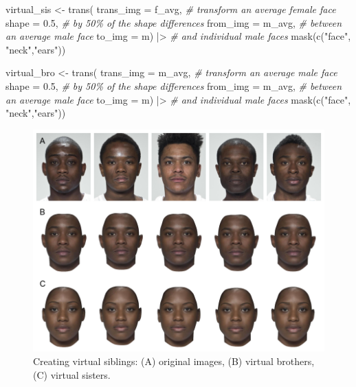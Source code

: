 \documentclass[
  doc,floatsintext]{apa6}
\newenvironment{Shaded}{\begin{snugshade}}{\end{snugshade}}
\newcommand{\AttributeTok}[1]{\textcolor[rgb]{0.77,0.63,0.00}{#1}}
\newcommand{\CommentTok}[1]{\textcolor[rgb]{0.56,0.35,0.01}{\textit{#1}}}
\newcommand{\FloatTok}[1]{\textcolor[rgb]{0.00,0.00,0.81}{#1}}
\newcommand{\FunctionTok}[1]{\textcolor[rgb]{0.00,0.00,0.00}{#1}}
\newcommand{\NormalTok}[1]{#1}
\newcommand{\OtherTok}[1]{\textcolor[rgb]{0.56,0.35,0.01}{#1}}
\newcommand{\SpecialCharTok}[1]{\textcolor[rgb]{0.00,0.00,0.00}{#1}}
\newcommand{\StringTok}[1]{\textcolor[rgb]{0.31,0.60,0.02}{#1}}
\begin{document}
\begin{Shaded}
\begin{Highlighting}[]
\NormalTok{virtual\_sis }\OtherTok{\textless{}{-}} \FunctionTok{trans}\NormalTok{(}
  \AttributeTok{trans\_img =}\NormalTok{ f\_avg,   }\CommentTok{\# transform an average female face}
  \AttributeTok{shape =} \FloatTok{0.5}\NormalTok{,         }\CommentTok{\# by 50\% of the shape differences}
  \AttributeTok{from\_img =}\NormalTok{ m\_avg,    }\CommentTok{\# between an average male face}
  \AttributeTok{to\_img =}\NormalTok{ m) }\SpecialCharTok{|\textgreater{}}       \CommentTok{\# and individual male faces}
  \FunctionTok{mask}\NormalTok{(}\FunctionTok{c}\NormalTok{(}\StringTok{"face"}\NormalTok{, }\StringTok{"neck"}\NormalTok{,}\StringTok{"ears"}\NormalTok{)) }

\NormalTok{virtual\_bro }\OtherTok{\textless{}{-}} \FunctionTok{trans}\NormalTok{(}
  \AttributeTok{trans\_img =}\NormalTok{ m\_avg,   }\CommentTok{\# transform an average male face}
  \AttributeTok{shape =} \FloatTok{0.5}\NormalTok{,         }\CommentTok{\# by 50\% of the shape differences}
  \AttributeTok{from\_img =}\NormalTok{ m\_avg,    }\CommentTok{\# between an average male face}
  \AttributeTok{to\_img =}\NormalTok{ m) }\SpecialCharTok{|\textgreater{}}       \CommentTok{\# and individual male faces}
  \FunctionTok{mask}\NormalTok{(}\FunctionTok{c}\NormalTok{(}\StringTok{"face"}\NormalTok{, }\StringTok{"neck"}\NormalTok{,}\StringTok{"ears"}\NormalTok{))}
\end{Highlighting}
\end{Shaded}

\begin{figure}
\includegraphics[width=1\linewidth]{index_files/figure-latex/virtual-sibs-1} \caption{Creating virtual siblings: (A) original images, (B) virtual brothers, (C) virtual sisters.}\label{fig:virtual-sibs}
\end{figure}
\end{document}
